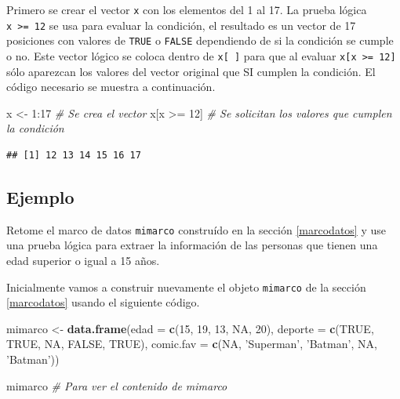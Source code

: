 \documentclass[10pt,]{krantz}
\makeatletter
\newenvironment{Shaded}{\begin{snugshade}}{\end{snugshade}}
\newcommand{\KeywordTok}[1]{\textcolor[rgb]{0.13,0.29,0.53}{\textbf{{#1}}}}
\newcommand{\DataTypeTok}[1]{\textcolor[rgb]{0.13,0.29,0.53}{{#1}}}
\newcommand{\DecValTok}[1]{\textcolor[rgb]{0.00,0.00,0.81}{{#1}}}
\newcommand{\StringTok}[1]{\textcolor[rgb]{0.31,0.60,0.02}{{#1}}}
\newcommand{\CommentTok}[1]{\textcolor[rgb]{0.56,0.35,0.01}{\textit{{#1}}}}
\newcommand{\OtherTok}[1]{\textcolor[rgb]{0.56,0.35,0.01}{{#1}}}
\newcommand{\NormalTok}[1]{{#1}}
\newenvironment{kframe}{%
\medskip{}
\setlength{\fboxsep}{.8em}
 \def\at@end@of@kframe{}%
 \ifinner\ifhmode%
  \def\at@end@of@kframe{\end{minipage}}%
  \begin{minipage}{\columnwidth}%
 \fi\fi%
 \def\FrameCommand##1{\hskip\@totalleftmargin \hskip-\fboxsep
 \colorbox{shadecolor}{##1}\hskip-\fboxsep
     \hskip-\linewidth \hskip-\@totalleftmargin \hskip\columnwidth}%
 \MakeFramed {\advance\hsize-\width
   \@totalleftmargin\z@ \linewidth\hsize
   \@setminipage}}%
 {\par\unskip\endMakeFramed%
 \at@end@of@kframe}
\renewenvironment{Shaded}{\begin{kframe}}{\end{kframe}}
\makeatother
\begin{document}
Primero se crear el vector \texttt{x} con los elementos del 1 al 17. La
prueba lógica \texttt{x\ \textgreater{}=\ 12} se usa para evaluar la
condición, el resultado es un vector de 17 posiciones con valores de
\texttt{TRUE} o \texttt{FALSE} dependiendo de si la condición se cumple
o no. Este vector lógico se coloca dentro de \texttt{x{[}\ {]}} para que
al evaluar \texttt{x{[}x\ \textgreater{}=\ 12{]}} sólo aparezcan los
valores del vector original que SI cumplen la condición. El código
necesario se muestra a continuación.

\begin{Shaded}
\begin{Highlighting}[]
\NormalTok{x <-}\StringTok{ }\DecValTok{1}\NormalTok{:}\DecValTok{17}  \CommentTok{# Se crea el vector}
\NormalTok{x[x >=}\StringTok{ }\DecValTok{12}\NormalTok{]  }\CommentTok{# Se solicitan los valores que cumplen la condición}
\end{Highlighting}
\end{Shaded}

\begin{verbatim}
## [1] 12 13 14 15 16 17
\end{verbatim}

\subsection*{Ejemplo}\label{ejemplo-7}


Retome el marco de datos \texttt{mimarco} construído en la sección
\ref{marcodatos} y use una prueba lógica para extraer la información de
las personas que tienen una edad superior o igual a 15 años.

Inicialmente vamos a construir nuevamente el objeto \texttt{mimarco} de
la sección \ref{marcodatos} usando el siguiente código.

\begin{Shaded}
\begin{Highlighting}[]
\NormalTok{mimarco <-}\StringTok{ }\KeywordTok{data.frame}\NormalTok{(}\DataTypeTok{edad =} \KeywordTok{c}\NormalTok{(}\DecValTok{15}\NormalTok{, }\DecValTok{19}\NormalTok{, }\DecValTok{13}\NormalTok{, }\OtherTok{NA}\NormalTok{, }\DecValTok{20}\NormalTok{), }
                      \DataTypeTok{deporte =} \KeywordTok{c}\NormalTok{(}\OtherTok{TRUE}\NormalTok{, }\OtherTok{TRUE}\NormalTok{, }\OtherTok{NA}\NormalTok{, }\OtherTok{FALSE}\NormalTok{, }\OtherTok{TRUE}\NormalTok{),}
                      \DataTypeTok{comic.fav =} \KeywordTok{c}\NormalTok{(}\OtherTok{NA}\NormalTok{, }\StringTok{'Superman'}\NormalTok{, }\StringTok{'Batman'}\NormalTok{,}
                                    \OtherTok{NA}\NormalTok{, }\StringTok{'Batman'}\NormalTok{))}

\NormalTok{mimarco  }\CommentTok{# Para ver el contenido de mimarco}
\end{Highlighting}
\end{Shaded}
\end{document}
